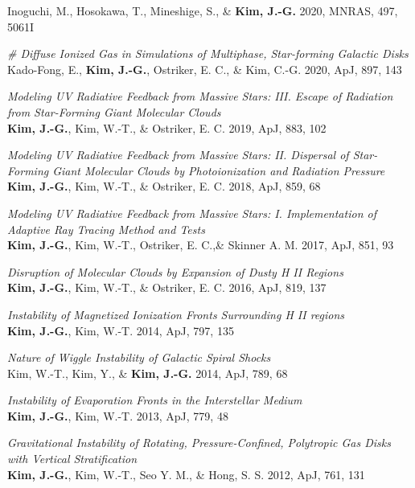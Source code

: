 \begin{benumerate}{18}
  Inoguchi, M., Hosokawa, T., Mineshige, S., \& \textbf{Kim, J.-G.} 2020, MNRAS,
  497, 5061I
\item \textit{\# Diffuse Ionized Gas in Simulations of Multiphase, Star-forming
    Galactic Disks}\\
  Kado-Fong, E., \textbf{Kim, J.-G.}, Ostriker, E. C., \& Kim, C.-G. 2020, ApJ,
  897, 143
\item \textit{Modeling UV Radiative Feedback from Massive Stars: III. Escape
    of Radiation from Star-Forming Giant Molecular Clouds} \\ \textbf{Kim,
    J.-G.}, Kim, W.-T., \& Ostriker, E. C. 2019, ApJ, 883, 102
\item \textit{Modeling UV Radiative Feedback from Massive Stars: II. Dispersal
of Star-Forming Giant Molecular Clouds by Photoionization and Radiation
Pressure} \\ \textbf{Kim, J.-G.}, Kim, W.-T., \& Ostriker, E. C. 2018, ApJ, 859,
68
\item \textit{Modeling UV Radiative Feedback from Massive Stars: I.
Implementation of Adaptive Ray Tracing Method and Tests}\\ \textbf{Kim, J.-G.},
Kim, W.-T., Ostriker, E. C.,\& Skinner A. M. 2017, ApJ, 851, 93
\item \textit{Disruption of Molecular Clouds by Expansion of Dusty H II
Regions}\\ \textbf{Kim, J.-G.}, Kim, W.-T., \& Ostriker, E. C. 2016, ApJ, 819,
137
\item \textit{Instability of Magnetized Ionization Fronts Surrounding H II
regions}\\ \textbf{Kim, J.-G.}, Kim, W.-T. 2014, ApJ, 797, 135
\item \textit{Nature of Wiggle Instability of Galactic Spiral Shocks}\\ Kim,
W.-T., Kim, Y., \& \textbf{Kim, J.-G.} 2014, ApJ, 789, 68
\item \textit{Instability of Evaporation Fronts in the Interstellar Medium}\\
  \textbf{Kim, J.-G.}, Kim, W.-T. 2013, ApJ, 779, 48
\item \textit{Gravitational Instability of Rotating, Pressure-Confined,
    Polytropic Gas Disks with Vertical Stratification} \\ \textbf{Kim, J.-G.},
  Kim, W.-T., Seo Y. M., \& Hong, S. S. 2012, ApJ, 761, 131
\end{benumerate}

